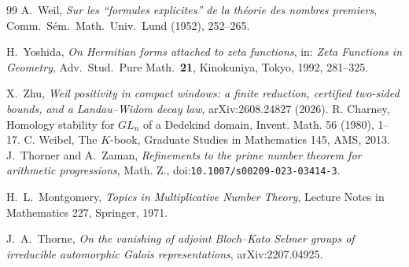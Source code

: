 \documentclass[11pt]{amsart}
\theoremstyle{definition}
\theoremstyle{remark}
\begin{document}
\begin{thebibliography}{99}
 A.~Weil, \emph{Sur les ``formules explicites'' de la th\'eorie des nombres
premiers}, Comm.~S\'em.~Math.~Univ.~Lund (1952), 252--265.

 H.~Yoshida, \emph{On Hermitian forms attached to zeta functions}, in:
\emph{Zeta Functions in Geometry}, Adv.~Stud.~Pure Math.~\textbf{21}, Kinokuniya, Tokyo, 1992, 281--325.

 X.~Zhu, \emph{Weil positivity in compact windows: a finite reduction, certified
two-sided bounds, and a Landau--Widom decay law}, arXiv:2608.24827 (2026).
 R. Charney, Homology stability for $GL_n$ of a Dedekind domain, Invent. Math. 56 (1980), 1--17.
 C. Weibel, The $K$-book, Graduate Studies in Mathematics 145, AMS, 2013.
 J.~Thorner and A.~Zaman,
\emph{Refinements to the prime number theorem for arithmetic progressions},
Math. Z., doi:\nolinkurl{10.1007/s00209-023-03414-3}.

 H.~L.~Montgomery,
\emph{Topics in Multiplicative Number Theory}, Lecture Notes in
Mathematics 227, Springer, 1971.

 J.~A.~Thorne, \emph{On the vanishing of adjoint
Bloch--Kato Selmer groups of irreducible automorphic Galois representations},
arXiv:2207.04925.
\end{thebibliography}
\end{document}
